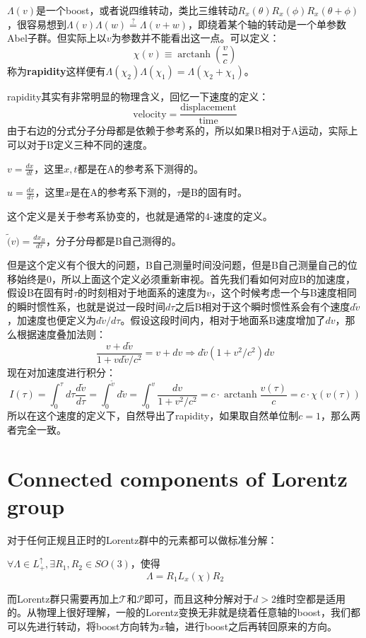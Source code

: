 $\Lambda(v)$是一个boost，或者说四维转动，类比三维转动$R_x(\theta)R_x(\phi)R_x(\theta+\phi)$，很容易想到$\Lambda(v)\Lambda(w)\overset{?}{=}\Lambda(v+w)$，即绕着某个轴的转动是一个单参数Abel子群。但实际上以$v$为参数并不能看出这一点。可以定义：
\begin{equation}
	\chi(v)\equiv\operatorname{arctanh}(\frac{v}{c})
\end{equation}
称为\textbf{rapidity}这样便有$\Lambda(\chi_2)\Lambda(\chi_1)=\Lambda(\chi_2+\chi_1)$。

rapidity其实有非常明显的物理含义，回忆一下速度的定义：
\[\text{velocity}=\frac{\text{displacement}}{\text{time}}\]
由于右边的分式分子分母都是依赖于参考系的，所以如果B相对于A运动，实际上可以对于B定义三种不同的速度。
\begin{definition}
	$v=\frac{dx}{dt}$，这里$x,t$都是在A的参考系下测得的。
\end{definition}
\begin{definition}
	$u=\frac{dx}{d\tau}$，这里$x$是在A的参考系下测的，$\tau$是B的固有时。
\end{definition}
这个定义是关于参考系协变的，也就是通常的$\mathfrak{4}$\mbox{-}速度的定义。
\begin{definition}
	$\tilde(v)=\frac{dx_B}{d\tau}$，分子分母都是B自己测得的。
\end{definition}
但是这个定义有个很大的问题，B自己测量时间没问题，但是B自己测量自己的位移始终是0，所以上面这个定义必须重新审视。首先我们看如何对应B的加速度，假设B在固有时$\tau$的时刻相对于地面系的速度为$v$，这个时候考虑一个与B速度相同的瞬时惯性系，也就是说过一段时间$d\tau$之后B相对于这个瞬时惯性系会有个速度$d\tilde{v}$，加速度也便定义为$d\tilde{v}/d\tau$。假设这段时间内，相对于地面系B速度增加了$dv$，那么根据速度叠加法则：
\begin{equation}
	\frac{v+d\tilde{v}}{1+vd\tilde{v}/c^2}=v+dv\Rightarrow d\tilde{v}\left(1+v^2/c^2\right)dv
\end{equation}
现在对加速度进行积分：
\begin{equation}
		I(\tau)=\int^\tau_0 d\tau\frac{d\tilde{v}}{d\tau}=\int^{\tilde{v}}_0d\tilde{v}=\int^{v}_0\frac{dv}{1+v^2/c^2}=c\cdot\operatorname{arctanh}\frac{v(\tau)}{c}=c\cdot\chi(v(\tau))
\end{equation}
所以在这个速度的定义下，自然导出了rapidity，如果取自然单位制$c=1$，那么两者完全一致。
\section{Connected components of Lorentz group}
对于任何正规且正时的Lorentz群中的元素都可以做标准分解：
\begin{theorem}
	$\forall \Lambda\in L_+^\uparrow, \exists R_1,R_2\in SO(3)$，使得
	\begin{equation}\label{eq:4.1}
		\Lambda = R_1 L_x(\chi) R_2
	\end{equation}
\end{theorem}
而Lorentz群只需要再加上$\mathcal{T}$和$\mathcal{P}$即可，而且这种分解对于$d>2$维时空都是适用的。从物理上很好理解，一般的Lorentz变换无非就是绕着任意轴的boost，我们都可以先进行转动，将boost方向转为$x$轴，进行boost之后再转回原来的方向。

